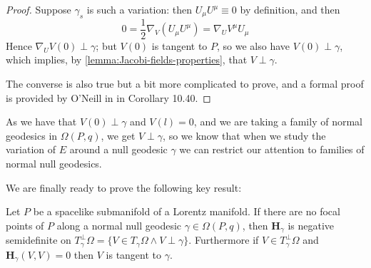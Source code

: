 \begin{proof}
	Suppose \(\gamma_s\) is such a variation: then \(U_{\mu}U^{\mu}\equiv 0\) by definition, and then
	\[
	0 = \frac{1}{2}\nabla_V(U_{\mu}U^{\mu}) = \nabla_UV^{\mu}U_{\mu}
	\]
	Hence \(\nabla_UV(0) \perp \gamma\); but \(V(0)\) is tangent to \(P\), so we also have \(V(0) \perp \gamma\), which implies, by \ref{lemma:Jacobi-fields-properties}, that \(V \perp \gamma\).
	
	The converse is also true but a bit more complicated to prove, and a formal proof is provided by O'Neill in \cite{o1983semi} in Corollary 10.40.
\end{proof}

As we have that \(V(0) \perp \gamma\) and \(V(l) = 0\), and we are taking a family of normal geodesics in \(\Omega(P, q)\), we get \(V \perp \gamma\), so we know that when we study the variation of \(E\) around a null geodesic \(\gamma\) we can restrict our attention to families of normal null geodesics.

We are finally ready to prove the following key result:
\begin{prop}
	\label{prop:H-positivity-criteria}
	Let \(P\) be a spacelike submanifold of a Lorentz manifold. If there are no focal points of \(P\) along a normal null geodesic \(\gamma\in\Omega(P,q)\), then \(\textbf{H}_\gamma\) is negative semidefinite on 
	\(T_{\gamma}^{\perp}\Omega = \{V \in T_{\gamma}\Omega \wedge V \perp \gamma\}\). Furthermore if \(V \in T_{\gamma}^{\perp}\Omega \) and \(\textbf{H}_\gamma(V, V) = 0\) then \(V\) is tangent to \(\gamma\).
\end{prop}

